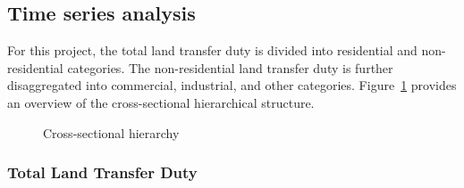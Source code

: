 \documentclass[
  11pt,
  a4paper,
]{article}
\begin{document}
\subsection{Time series analysis}\label{sec-tsanalysis}

For this project, the total land transfer duty is divided into
residential and non-residential categories. The non-residential land
transfer duty is further disaggregated into commercial, industrial, and
other categories. Figure~\ref{fig-crosssec1} provides an overview of the
cross-sectional hierarchical structure.

\begin{figure}


\caption{\label{fig-crosssec1}Cross-sectional hierarchy}

\end{figure}%

\subsubsection{Total Land Transfer Duty}\label{total-land-transfer-duty}
\end{document}
